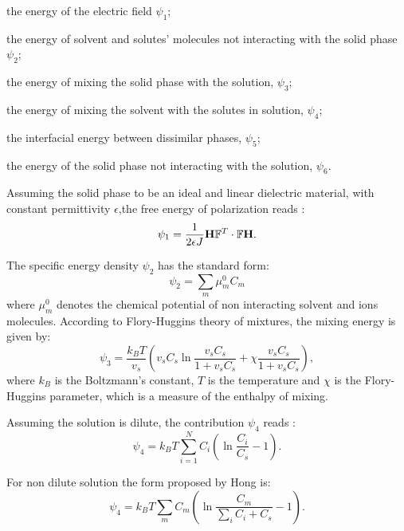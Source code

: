 \begin{enumerate}
	{\indentitem\item[\textbullet] the energy of the electric field $\psi_1$;}
	{\indentitem \item[\textbullet] the energy of solvent and solutes' molecules not interacting with the solid phase $\psi_2$;}
	{\indentitem\item[\textbullet] the energy of mixing the solid phase with the solution, $\psi_3$;}
	{\indentitem\item[\textbullet] the energy of mixing the solvent with the solutes in solution, $\psi_4$;}
	{\indentitem\item[\textbullet] the interfacial energy between dissimilar phases, $\psi_5$;}
	{\indentitem\item[\textbullet] the energy of the solid phase not interacting with the solution, $\psi_6$.}
\end{enumerate}

Assuming the solid phase to be an ideal and linear dielectric material, with constant permittivity $\epsilon$,the free energy of polarization reads \cite{DROZDOV+,Reviewpolyel}:
\begin{gather}
\psi_1 = \frac{1}{2\epsilon J} \mathbf{H}\mathbb{F}^T \cdot \mathbb{F} \mathbf{H}.
\end{gather}

The specific energy density $\psi_2$ has the standard form:
\begin{equation}
\psi_2 = \sum\limits_{m} \mu^0_m C_m
\end{equation} 
where $\mu^0_m$ denotes the chemical potential of non interacting solvent and ions molecules. According to Flory-Huggins theory \cite{flory,hug} of mixtures, the mixing energy is given by:
\begin{equation}
\psi_3 = \frac{k_B T }{v_s} \left(v_sC_s \ln \frac{v_sC_s}{1+v_sC_s} + \chi \frac{v_sC_s}{1+v_sC_s}\right),\label{mix}
\end{equation}
where $k_B$ is the Boltzmann's constant, $T$ is the temperature and $\chi$ is the Flory-Huggins parameter, which is a measure of the enthalpy of mixing. 

Assuming the solution is dilute, the contribution $\psi_4$ reads \cite{Reviewpolyel,ecm1,ecm2}:
\begin{equation}
\psi_4 = k_B T \sum\limits_{i=1}^{N} C_i \left(\ln \frac{C_i}{ C_s}-1\right).
\end{equation}

For non dilute solution the form proposed by Hong \cite{Reviewpolyel} is:
\begin{equation}
\psi_4 = k_B T \sum\limits_{m} C_m \left(\ln \frac{C_m}{\sum_i C_i+C_s}-1\right).
\end{equation}

